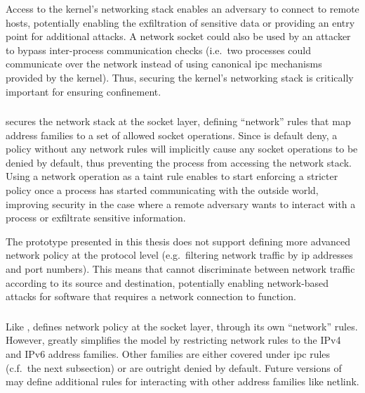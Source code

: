 Access to the kernel's networking stack enables an adversary to connect to remote hosts,
potentially enabling the exfiltration of sensitive data or providing an entry point for
additional attacks. A network socket could also be used by an attacker to bypass
inter-process communication checks (i.e.\ two processes could communicate over the network
instead of using canonical \gls{ipc} mechanisms provided by the kernel). Thus, securing
the kernel's networking stack is critically important for ensuring confinement.

\subsubsection{\bpfbox{}}

\bpfbox{} secures the network stack at the socket layer, defining \enquote{network} rules
that map address families to a set of allowed socket operations. Since \bpfbox{} is
default deny, a policy without any network rules will implicitly cause any socket
operations to be denied by default, thus preventing the process from accessing the network
stack. Using a network operation as a taint rule enables \bpfbox{} to start enforcing
a stricter policy once a process has started communicating with the outside world,
improving security in the case where a remote adversary wants to interact with a process
or exfiltrate sensitive information.

The \bpfbox{} prototype presented in this thesis does not support defining more advanced
network policy at the protocol level (e.g.\ filtering network traffic by \gls{ip} addresses
and port numbers). This means that \bpfbox{} cannot discriminate between network traffic
according to its source and destination, potentially enabling network-based attacks for
software that requires a network connection to function.

\subsubsection{\bpfcontain{}}

Like \bpfbox{}, \bpfcontain{} defines network policy at the socket layer, through its own
\enquote{network} rules. However, \bpfcontain{} greatly simplifies the \bpfbox{} model by
restricting network rules to the IPv4 and IPv6 address families. Other families are either
covered under \gls{ipc} rules (c.f.\ the next subsection) or are outright denied by
default. Future versions of \bpfcontain{} may define additional rules for interacting with
other address families like netlink.

